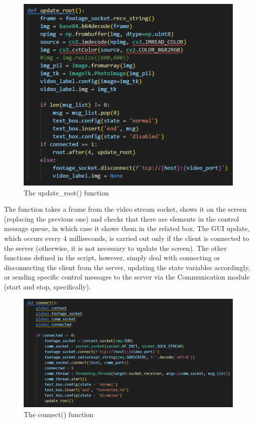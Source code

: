 \documentclass[a4paper,11pt]{report}
\theoremstyle{definition}
\theoremstyle{plain}
\begin{document}
            \begin{figure}[H]
            \includegraphics[scale=0.7]{images/update_root.png}
            \centering
            \caption{The update\_root() function}
            \end{figure}
            The function takes a frame from the video stream socket, shows it on the screen (replacing the previous one) and checks that there are elements in the control message queue, in which case it shows them in the related box. The GUI update, which occurs every 4 milliseconds, is carried out only if the client is connected to the server (otherwise, it is not necessary to update the screen).
            The other functions defined in the script, however, simply deal with connecting or disconnecting the client from the server, updating the state variables accordingly, or sending specific control messages to the server via the Communication module (start and stop, specifically).
            
            \begin{figure}[H]
            \includegraphics[scale=0.7]{images/connect func.png}
            \centering
            \caption{The connect() function}
            \end{figure}
            
\end{document}
